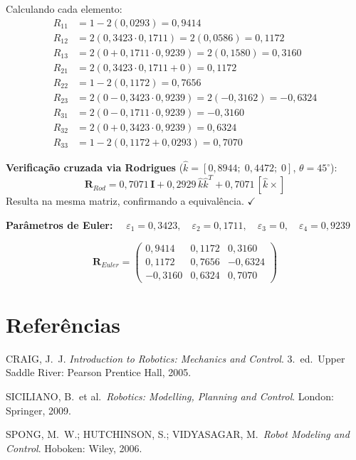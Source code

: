 \documentclass[12pt,a4paper]{article}
\newcommand{\degr}{^{\circ}}
\begin{document}
Calculando cada elemento:
\begin{align*}
  R_{11} &= 1 - 2(0{,}0293) = 0{,}9414 \\
  R_{12} &= 2(0{,}3423\cdot0{,}1711) = 2(0{,}0586) = 0{,}1172 \\
  R_{13} &= 2(0 + 0{,}1711\cdot0{,}9239) = 2(0{,}1580) = 0{,}3160 \\
  R_{21} &= 2(0{,}3423\cdot0{,}1711 + 0) = 0{,}1172 \\
  R_{22} &= 1 - 2(0{,}1172) = 0{,}7656 \\
  R_{23} &= 2(0 - 0{,}3423\cdot0{,}9239) = 2(-0{,}3162) = -0{,}6324 \\
  R_{31} &= 2(0 - 0{,}1711\cdot0{,}9239) = -0{,}3160 \\
  R_{32} &= 2(0 + 0{,}3423\cdot0{,}9239) = 0{,}6324 \\
  R_{33} &= 1 - 2(0{,}1172+0{,}0293) = 0{,}7070
\end{align*}

\textbf{Verificação cruzada via Rodrigues} ($\hat{k}=[0{,}8944;\;0{,}4472;\;0]$, $\theta=45\degr$):
\[
\mathbf{R}_{Rod} = 0{,}7071\,\mathbf{I} + 0{,}2929\,\hat{k}\hat{k}^T + 0{,}7071\,[\hat{k}\times]
\]
Resulta na mesma matriz, confirmando a equivalência. $\checkmark$

\begin{tcolorbox}[resultbox]
\textbf{Parâmetros de Euler:}
$\quad\varepsilon_1 = 0{,}3423,\quad\varepsilon_2 = 0{,}1711,\quad\varepsilon_3 = 0,\quad\varepsilon_4 = 0{,}9239$

\[
\mathbf{R}_{Euler} =
\begin{pmatrix}
  0{,}9414 &  0{,}1172 &  0{,}3160 \\
  0{,}1172 &  0{,}7656 & -0{,}6324 \\
 -0{,}3160 &  0{,}6324 &  0{,}7070
\end{pmatrix}
\]
\end{tcolorbox}

\newpage

\section*{Referências}

\begin{enumerate}[label={[\arabic*]}]
  \item CRAIG, J.\ J. \textit{Introduction to Robotics: Mechanics and Control}.
        3.\ ed.\ Upper Saddle River: Pearson Prentice Hall, 2005.
  \item SICILIANO, B.\ et al.\ \textit{Robotics: Modelling, Planning and Control}.
        London: Springer, 2009.
  \item SPONG, M.\ W.; HUTCHINSON, S.; VIDYASAGAR, M.\ \textit{Robot Modeling and Control}.
        Hoboken: Wiley, 2006.
\end{enumerate}
\end{document}
